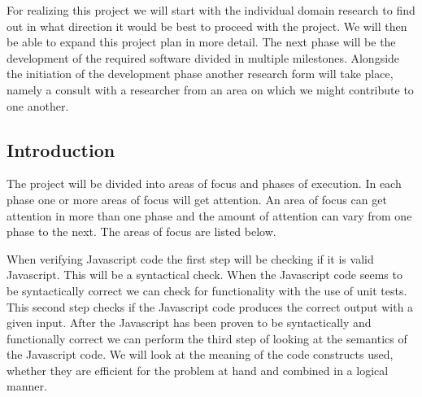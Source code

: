 \documentclass{article}
\begin{document}

For realizing this project we will start with the individual domain research to
find out in what direction it would be best to proceed with the project. We
will then be able to expand this project plan in more detail. The next phase
will be the development of the required software divided in multiple
milestones. Alongside the initiation of the development phase another research
form will take place, namely a consult with a researcher from an area on which
we might contribute to one another.

\subsection{Introduction}


The project will be divided into areas of focus and phases of execution. In
each phase one or more areas of focus will get attention. An area of focus can
get attention in more than one phase and the amount of attention can vary from
one phase to the next. The areas of focus are listed below.

When verifying Javascript code the first step will be checking if it is valid
Javascript. This will be a syntactical check. When the Javascript code seems to
be syntactically correct we can check for functionality with the use of unit
tests. This second step checks if the Javascript code produces the correct
output with a given input. After the Javascript has been proven to be
syntactically and functionally correct we can perform the third step of looking
at the semantics of the Javascript code. We will look at the meaning of the
code constructs used, whether they are efficient for the problem at hand and
combined in a logical manner.
\end{document}

